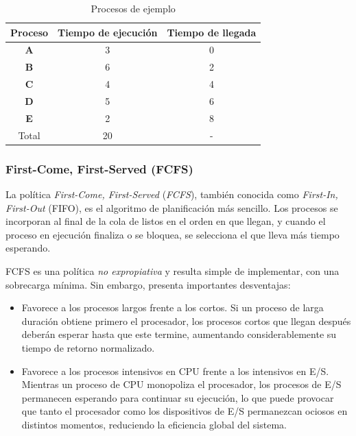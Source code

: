 \begin{table}
  \centering
  \begin{tabular}{c|c|c}
    Proceso & Tiempo de ejecución & Tiempo de llegada \\ 
    \hline
    \textbf{A} & 3 & 0 \\ 
    \color{green!60!black} \textbf{B} & 6 & 2 \\ 
    \color{blue!60!red} \textbf{C} & 4 & 4 \\ 
    \color{red!70!black} \textbf{D} & 5 & 6 \\ 
    \color{blue!60} \textbf{E} & 2 & 8 \\ 
    \hline
    Total & 20 & -
  \end{tabular}
  \caption{Procesos de ejemplo}
  \label{tab:pr_ej}
\end{table}

\subsubsection{First-Come, First-Served (FCFS)}

La política \textit{First-Come, First-Served} (\textit{FCFS}), también conocida como \textit{First-In, First-Out} (FIFO), es el algoritmo de planificación más sencillo. Los procesos se incorporan al final de la cola de listos en el orden en que llegan, y cuando el proceso en ejecución finaliza o se bloquea, se selecciona el que lleva más tiempo esperando.

FCFS es una política \textit{no expropiativa} y resulta simple de implementar, con una sobrecarga mínima. Sin embargo, presenta importantes desventajas:
\begin{itemize}
  \item Favorece a los procesos largos frente a los cortos. Si un proceso de larga duración obtiene primero el procesador, los procesos cortos que llegan después deberán esperar hasta que este termine, aumentando considerablemente su tiempo de retorno normalizado.
  \item Favorece a los procesos intensivos en CPU frente a los intensivos en E/S. Mientras un proceso de CPU monopoliza el procesador, los procesos de E/S permanecen esperando para continuar su ejecución, lo que puede provocar que tanto el procesador como los dispositivos de E/S permanezcan ociosos en distintos momentos, reduciendo la eficiencia global del sistema.
\end{itemize}

